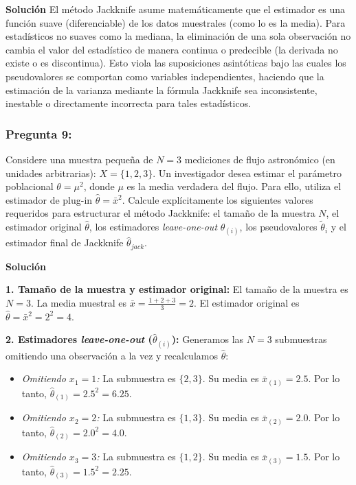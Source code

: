 \documentclass[a4paper]{article}
\begin{document}
\textbf{Solución}
El método Jackknife asume matemáticamente que el estimador es una función suave (diferenciable) de los datos muestrales (como lo es la media). Para estadísticos no suaves como la mediana, la eliminación de una sola observación no cambia el valor del estadístico de manera continua o predecible (la derivada no existe o es discontinua). Esto viola las suposiciones asintóticas bajo las cuales los pseudovalores se comportan como variables independientes, haciendo que la estimación de la varianza mediante la fórmula Jackknife sea inconsistente, inestable o directamente incorrecta para tales estadísticos.

\subsubsection{Pregunta 9:} Considere una muestra pequeña de $N=3$ mediciones de flujo astronómico (en unidades arbitrarias): $X = \{1, 2, 3\}$. Un investigador desea estimar el parámetro poblacional $\theta = \mu^2$, donde $\mu$ es la media verdadera del flujo. Para ello, utiliza el estimador de plug-in $\hat{\theta} = \bar{x}^2$. 
Calcule explícitamente los siguientes valores requeridos para estructurar el método Jackknife: el tamaño de la muestra $N$, el estimador original $\hat{\theta}$, los estimadores \textit{leave-one-out} $\hat{\theta}_{(i)}$, los pseudovalores $\tilde{\theta}_i$ y el estimador final de Jackknife $\hat{\theta}_{jack}$.

\textbf{Solución}

\textbf{1. Tamaño de la muestra y estimador original:}
El tamaño de la muestra es $N = 3$. 
La media muestral es $\bar{x} = \frac{1+2+3}{3} = 2$.
El estimador original es $\hat{\theta} = \bar{x}^2 = 2^2 = 4$.

\textbf{2. Estimadores \textit{leave-one-out} ($\hat{\theta}_{(i)}$):}
Generamos las $N=3$ submuestras omitiendo una observación a la vez y recalculamos $\hat{\theta}$:
\begin{itemize}
    \item \textit{Omitiendo $x_1=1$:} La submuestra es $\{2, 3\}$. Su media es $\bar{x}_{(1)} = 2.5$. Por lo tanto, $\hat{\theta}_{(1)} = 2.5^2 = 6.25$.
    \item \textit{Omitiendo $x_2=2$:} La submuestra es $\{1, 3\}$. Su media es $\bar{x}_{(2)} = 2.0$. Por lo tanto, $\hat{\theta}_{(2)} = 2.0^2 = 4.0$.
    \item \textit{Omitiendo $x_3=3$:} La submuestra es $\{1, 2\}$. Su media es $\bar{x}_{(3)} = 1.5$. Por lo tanto, $\hat{\theta}_{(3)} = 1.5^2 = 2.25$.
\end{itemize}
\end{document}
